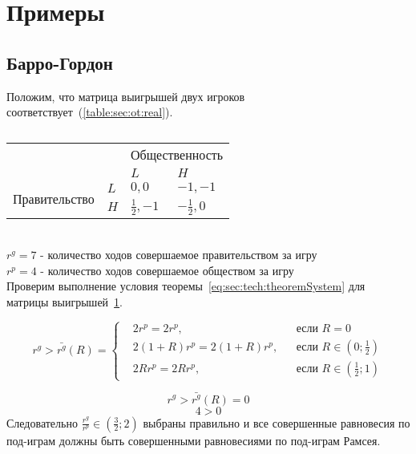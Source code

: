 \section{Примеры} 
\subsection{Барро-Гордон}
Положим, что матрица выигрышей двух игроков соответствует~(\ref{table:sec:ot:real}).\\
\begin{table}[h]
	\centering
	\begin{tabular}{|l|l|l|l|}
		\hline
		\multicolumn{2}{|l|}{\multirow{2}{*}{}} & \multicolumn{2}{l|}{Общественность} \\ \cline{3-4} 
		\multicolumn{2}{|l|}{}                  & $L$            & $H$            \\ \hline
		\multirow{2}{*}{Правительство}     & $L$     & $0,0$          & $-1,-1$          \\ \cline{2-4} 
		& $H$     & $\frac{1}{2},-1$          & $-\frac{1}{2},0$          \\ \hline
	\end{tabular}
	\caption{}	
	\label{table:sec:ot:real1}
\end{table}\\
$r^g= 7 $ - количество ходов совершаемое  правительством за игру\\
$r^p= 4 $ - количество ходов совершаемое  обществом за игру\\

Проверим выполнение условия теоремы~\ref{eq:sec:tech:theoremSystem} для матрицы выигрышей~\ref{table:sec:ot:real1}. 

$$
r^g> \bar{r^g}(R) = \left\{ 
\begin{aligned} 
&2r^p= 2r^p, &&\text{если } R=0
\\
&2(1+R)r^p= 2(1+R)r^p, &&\text{если } 	R\in\left(0; \frac{1}{2}\right)
\\
&2Rr^p= 2Rr^p, &&\text{если } 	R\in\left( \frac{1}{2};1\right)
\end{aligned}
\right.		
$$

$$
r^g> \bar{r^g}(R) = 0$$
$$
4 > 0
$$
Следовательно $\frac{r^g}{r^p} \in \left(\frac{3}{2};2\right)$ выбраны правильно и все совершенные равновесия по под-играм должны быть совершенными равновесиями по под-играм Рамсея. \\
 
